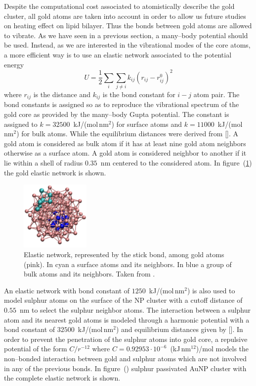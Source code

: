 Despite the computational cost associated to atomistically describe the gold cluster, all gold atoms are taken into account in order to allow us future studies on heating effect on lipid bilayer. Thus the bonds between gold atoms are allowed to vibrate. As we have seen in a previous section, a many--body potential should be used. Instead, as we are interested in the vibrational modes of the core atoms, 
a more efficient way is to use an elastic network associated to the potential energy
\begin{equation*}
	U = \frac{1}{2}\sum_i \sum_{j\ne i}k_{ij}(r_{ij} - r_{ij}^0)^2
\end{equation*}
where $r_{ij}$ is the distance and $k_{ij}$ is the bond constant for $i-j$ atom pair. The bond constants is assigned so as to reproduce the vibrational spectrum of the gold core as provided by the many--body Gupta potential. The constant is assigned to $k = 32500$~kJ/(mol\,nm$^2$) for surface atoms and $k = 11000$~kJ/(mol\,nm$^2$) for bulk atoms. While the equilibrium distances were derived from []. A gold atom is considered as bulk atom if it has at least nine gold atom neighbors otherwise as a surface atom. A gold atom is considered neighbor to another if it lie within a shell of radius $0.35$~nm centered to the considered atom. In figure~(\ref{fig:goldNetwork}) the gold elastic network is shown.
\begin{figure}
	\centering
	\includegraphics[width=0.3\textwidth]{./img/goldNetwork}
	\caption{Elastic network, represented by the stick bond, among gold atoms (pink). In cyan a surface atoms and its neighbors. In blue a group of bulk atoms and its neighbors. Taken from \cite{simonelliThesis}.}
	\label{fig:goldNetwork}
\end{figure}

An elastic network with bond constant of $1250$~kJ/(mol\,nm$^2$) is also used to model sulphur atoms on the surface of the \ac{NP} cluster with a cutoff distance of $0.55$~nm to select the sulphur neighbor atoms. The interaction between a sulphur atom and its nearest gold atoms is modeled through a harmonic potential with a bond constant of $32500$~kJ/(mol\,nm$^2$) and equilibrium distances given by []. In order to prevent the penetration of the sulphur atoms into gold core, a repulsive potential of the form $C/r^{-12}$ where $C = 0.92953\cdot 10^{-6}$~(kJ\,nm$^{12}$)/mol models the non--bonded interaction between gold and sulphur atoms which are not involved in any of the previous bonds. In figure~() sulphur passivated Au\ac{NP} cluster with the complete elastic network is shown.

